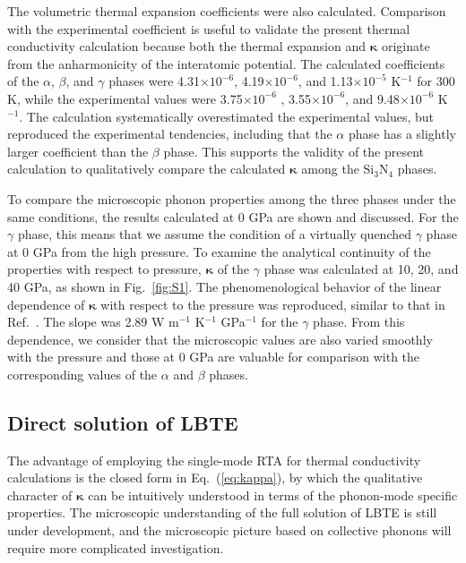 \documentclass[twocolumn,amsmath,amssymb,a4paper,prb,superscriptaddress,floatfix]{revtex4-1}
\begin{document}
The volumetric thermal expansion coefficients were also calculated.
Comparison with the experimental coefficient is useful to validate the present
thermal conductivity calculation because both the thermal expansion
and $\boldsymbol{\kappa}$ originate from the anharmonicity of the interatomic
potential.
The calculated coefficients of the $\alpha$, $\beta$, and $\gamma$ phases were
4.31$\times 10^{-6}$,  4.19$\times 10^{-6}$, and 1.13$\times 10^{-5}$
K$^{-1}$
for 300 K, while the experimental values\cite{minikayev-alpha, gamma-expand}
were 3.75$\times 10^{-6}$ , 3.55$\times 10^{-6}$, and 9.48$\times
10^{-6}$ K$^{-1}$. The calculation systematically overestimated the experimental
values, but reproduced the experimental tendencies, including that the $\alpha$
phase has a slightly larger coefficient than the $\beta$
phase. This supports the validity of the present calculation to qualitatively
compare the calculated $\boldsymbol{\kappa}$ among the Si$_3$N$_4$ phases.

To compare the microscopic phonon properties among the three phases under the
same conditions, the results calculated at 0 GPa are shown and discussed.  For
the $\gamma$ phase, this means that we assume the condition of a virtually
quenched $\gamma$ phase at 0 GPa from the high pressure. To examine the
analytical continuity of the properties with respect to pressure,
$\boldsymbol{\kappa}$ of the $\gamma$ phase was calculated at 10, 20, and 40
GPa, as shown in Fig.~\ref{fig:S1}. The phenomenological behavior of the linear
dependence of $\boldsymbol{\kappa}$ with respect to the pressure was reproduced,
similar to that in Ref.~. The slope was 2.89
W m$^{-1}$ K$^{-1}$ GPa$^{-1}$ for the $\gamma$ phase.  From this dependence, we
consider that the microscopic values are also varied smoothly with the pressure
and those at 0 GPa are valuable for comparison with the corresponding values of
the $\alpha$ and $\beta$ phases.

\subsection{Direct solution of LBTE}

The advantage of employing the single-mode RTA for thermal conductivity
calculations is the closed form in Eq.~(\ref{eq:kappa}), by which the qualitative character of
$\boldsymbol{\kappa}$ can be intuitively understood in terms of the phonon-mode
specific properties. The microscopic understanding of the full solution of LBTE
is still under development,\cite{cepellotti-relaxons} and the microscopic
picture based on collective phonons\cite{hardy-collective} will require more
complicated investigation.
\end{document}
